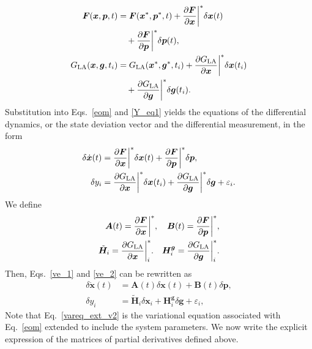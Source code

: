 \documentclass[lineno, pdflatex,sn-mathphys-ay]{sn-jnl}
\theoremstyle{thmstyleone}%
\theoremstyle{thmstyletwo}%
\theoremstyle{thmstylethree}%
\renewcommand{\vec}[1]{\boldsymbol{#1}}
\begin{document}
%
\begin{subequations}
\begin{align}
\vec{F}(\vec{x}, \vec{p}, t)
&= \vec{F}(\vec{x}^*, \vec{p}^*, t)
+ \pdv{\vec{F}}{\vec{x}} \bigg|^* \delta \vec{x}(t) \notag\\
&\quad + \pdv{\vec{F}}{\vec{p}} \bigg|^* \delta \vec{p}(t), \\
{G}_{\mathrm{LA}}(\vec{x}, \vec{g}, t_i)
&= {G}_{\mathrm{LA}}(\vec{x}^*, \vec{g}^*, t_i)
+ \pdv{{G}_{\mathrm{LA}}}{\vec{x}} \bigg|^* \delta \vec{x}(t_i) \notag\\
&\quad + \pdv{{G}_{\mathrm{LA}}}{\vec{g}} \bigg|^* \delta \vec{g}(t_i).
\end{align}
\end{subequations}
%
Substitution into Eqs.~\eqref{eom} and \eqref{Y_eq1} yields the equations of the differential dynamics, or the state deviation vector and the differential measurement, in the form
\begin{align}\label{ve_1}
	\delta\dot{\vec{x}}(t) &= \pdv{\vec{F}}{\vec{x}}\bigg|^* \delta \vec{x}(t) + \pdv{\vec{F}}{\vec{p}}\bigg|^* \delta \vec{p}, \\
	\label{ve_2}
	\delta {y}_i &= \pdv{{G}_{\mathrm{LA}}}{\vec{x}} \bigg|^*\delta \vec{x}(t_i) + \pdv{{G}_{\mathrm{LA}}}{\vec{g}}\bigg|^* \delta \vec{g} 
	+ \varepsilon_i.
\end{align}
%
We define
\begin{subequations}
	\begin{align}
	\vec{A}(t) = \pdv{\vec{F}}{\vec{x}}\bigg|^*, \quad 
	\vec{B}(t) = \pdv{\vec{F}}{\vec{p}}\bigg|^*, \\ %
	\tilde{\vec{H}}_i = \pdv{{G}_{\mathrm{LA}}}{\vec{x}}\bigg|^*_i.
	\quad 
	\vec{H}^{\vec{g}}_i = \pdv{{G}_{\mathrm{LA}}}{\vec{g}}\bigg|^*_i.
	\end{align}
\end{subequations}
%
Then, Eqs.~\eqref{ve_1} and  \eqref{ve_2} can be rewritten as
%
\begin{subequations}
	\begin{align}\label{vareq_ext_v2}
		\delta \dot{\vec{x}}(t) &= \vec{A}(t) \delta \vec{x}(t) + \vec{B}(t) \delta \vec{p},
		\\
		\delta {y}_i &= \tilde{\vec{H}}_i \delta \vec{x}_i 
		+ \vec{H}^{\vec{g}}_i \delta \vec{g}
		+ \varepsilon_i,
	\end{align}
\end{subequations}
%
Note that Eq.~\eqref{vareq_ext_v2} is the variational equation associated with Eq.~\eqref{eom} extended to include the system parameters. %
We now write the explicit expression of the matrices of partial derivatives defined above.
\end{document}

